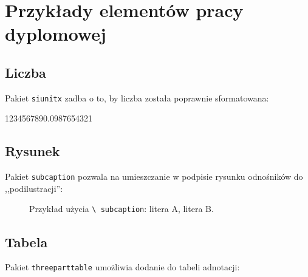 \chapter{Przykłady elementów pracy dyplomowej}

\section{Liczba}

Pakiet \texttt{siunitx} zadba o to, by liczba została poprawnie sformatowana: \\
\begin{center}
        \num{1234567890.0987654321}
\end{center}


\section{Rysunek}

Pakiet \texttt{subcaption} pozwala na umieszczanie w podpisie rysunku odnośników do ,,podilustracji'':\\ %

\begin{figure}[h]
        \centering
        \begin{subfigure}{0.35\textwidth}
                \centering
                \subcaption{\label{subfigure_a}}
        \end{subfigure}
        \begin{subfigure}{0.35\textwidth}
                \centering
                \subcaption{\label{subfigure_b}}
        \end{subfigure}\label{fig:subcaption_example}
	\caption{Przykład użycia \texttt{\textbackslash{} subcaption}: \protect{} litera A, \protect{} litera B.}
\end{figure}

\section{Tabela}

Pakiet \texttt{threeparttable} umożliwia dodanie do tabeli adnotacji: \\

